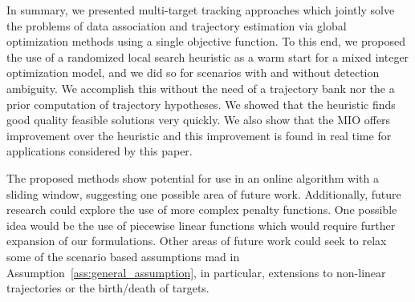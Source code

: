 In summary, we presented multi-target tracking approaches which jointly solve the problems of data association and trajectory estimation via global optimization methods using a single objective function. To this end, we proposed the use of a randomized local search heuristic as a warm start for a mixed integer optimization model, and we did so for scenarios with and without detection ambiguity. We accomplish this without the need of a trajectory bank nor the a prior computation of trajectory hypotheses. We showed that the heuristic finds good quality feasible solutions very quickly. We also show that the MIO offers improvement over the heuristic and this improvement is found in real time for applications considered by this paper.  

The proposed methods show potential for use in an online algorithm with a sliding window, suggesting one possible area of future work. Additionally, future research could explore the use of more complex penalty functions. One possible idea would be the use of piecewise linear functions which would require further expansion of our formulations. Other areas of future work could seek to relax some of the scenario based assumptions mad in Assumption~\ref{ass:general_assumption}, in particular, extensions to non-linear trajectories or the birth/death of targets. 
